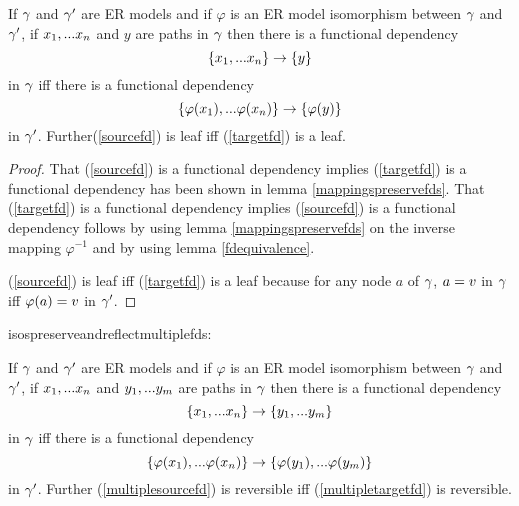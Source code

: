 \begin{lemma}
\label{isospreserveandreflectfds}
If $\gamma$ and $\gamma'$ are ER models and  if  $\varphi$ is an ER model isomorphism between $\gamma$  and $\gamma'$,  if $x_1,...x_n$ and $y$ are paths in $\gamma$
then there is a  functional dependency
\begin{equation}
\label{sourcefd}
\left\{x_1,...x_n\right\} \rightarrow \left\{y\right\}
\end{equation} 
in $\gamma$ iff there is a functional dependency
\begin{equation}
\label{targetfd}
\left\{\varphi(x_1),...\varphi(x_n)\right\} \rightarrow \left\{\varphi(y)\right\}
\end{equation}
in $\gamma'$.
Further(\ref{sourcefd}) is  leaf  iff (\ref{targetfd}) is a leaf.

\end{lemma}
\begin{proof}
\vspace{0.5cm}
That (\ref{sourcefd}) is a functional dependency implies
(\ref{targetfd}) is a functional dependency has been shown in lemma \ref{mappingspreservefds}. That (\ref{targetfd}) is a functional dependency implies
(\ref{sourcefd}) is a functional dependency follows by using lemma 
 \ref{mappingspreservefds}
on the inverse mapping $\varphi^{-1}$ and by using lemma  \ref{fdequivalence}.

(\ref{sourcefd}) is  leaf  iff (\ref{targetfd}) is a leaf 
because for any node $a$ of $\gamma$, $a= v$ in $\gamma$ iff $\varphi(a)=v$ in $\gamma'$.
\end{proof}

isospreserveandreflectmultiplefds:
\begin{corollary}
If $\gamma$ and $\gamma'$ are ER models and  if  $\varphi$ is an ER model isomorphism between $\gamma$  and $\gamma'$,  if $x_1,...x_n$ and $y_1,...y_m$ are paths 
in $\gamma$
then there is a  functional dependency
\begin{equation}
\label{multiplesourcefd}
\left\{x_1,...x_n\right\} \rightarrow \left\{y_1,...y_m\right\}
\end{equation} 
in $\gamma$ iff there is a functional dependency
\begin{equation}
\label{multipletargetfd}
\left\{\varphi(x_1),...\varphi(x_n)\right\} \rightarrow \left\{\varphi(y_1),...\varphi(y_m)\right\}
\end{equation}
in $\gamma'$.
Further (\ref{multiplesourcefd}) is reversible iff (\ref{multipletargetfd}) is reversible.
\end{corollary}

